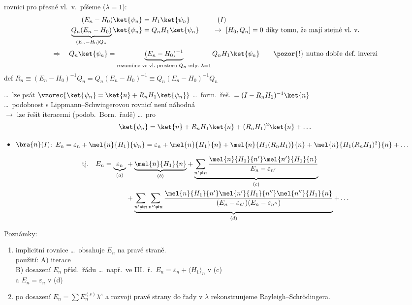 rovnici pro přesné vl.\ v.\ píšeme ($\lambda = 1$):
\begin{align*}
  (E_n - H_0)\ket{\psi_n} &= H_1\ket{\psi_n} \qquad\qquad (I) \\
  \underbrace{Q_n(E_n - H_0)}_{(E_n - H_0)Q_n}\ket{\psi_n} &= Q_nH_1\ket{\psi_n}
  \qquad\to\ [H_0,Q_n] = 0 \text{ díky tomu, že mají stejné vl.\ v.}
\end{align*}
\[
  \Rightarrow\quad Q_n\ket{\psi_n} = \underbrace{(E_n - H_0)^{-1}}_{\text{rozumíme ve vl.\ prostoru } Q_n \text{ odp.\ } \lambda = 1}Q_nH_1\ket{\psi_n}
  \qquad \text{\pozor{!} nutno dobře def.\ inverzi}
\]
def \quad $R_n \equiv (E_n - H_0)^{-1}Q_n = Q_n(E_n - H_0)^{-1} \equiv Q_n(E_n - H_0)^{-1}Q_n$

\dots\ lze psát \quad $\vzorec{\ket{\psi_n} = \ket{n} + R_nH_1\ket{\psi_n}}$ \quad \dots\ form.\ řeš.\ $= (I - R_nH_1)^{-1}\ket{n}$
 \\
\dots\ podobnost s Lippmann--Schwingerovou rovnicí není náhodná \\
$\to$ lze řešit iteracemi (podob.\ Born.\ řadě) \dots\ pro 
\[
  \ket{\psi_n} = \ket{n} + R_nH_1\ket{n} + (R_nH_1)^2\ket{n} + \dots
\]
\begin{itemize}
  \item $\bra{n}(I)$: \quad $E_n = \varepsilon_n + \mel{n}{H_1}{\psi_n} = \varepsilon_n + \mel{n}{H_1}{n} + \mel{n}{H_1(R_nH_1)}{n} + \mel{n}{H_1(R_nH_1)^2}{n} + \dots$
\end{itemize}
\begin{veta}
\begin{align*}
  \text{tj.}\quad
  E_n = \underbrace{\varepsilon_n}_{(a)} &+ \underbrace{\mel{n}{H_1}{n}}_{(b)}
  + \underbrace{\sum_{n'\neq n}\frac{\mel{n}{H_1}{n'}\mel{n'}{H_1}{n}}{E_n - \varepsilon_{n'}}}_{(c)} \\
  &+ \underbrace{\sum_{n'\neq n}\sum_{n''\neq n}\frac{\mel{n}{H_1}{n'}\mel{n'}{H_1}{n''}\mel{n''}{H_1}{n}}{(E_n - \varepsilon_{n'})(E_n - \varepsilon_{n''})}}_{(d)} + \dots
\end{align*}
\end{veta}

\underline{Poznámky:}
\begin{enumerate}[label=\arabic*)]
  \item implicitní rovnice \dots\ obsahuje $E_n$ na pravé straně. \\
        použití: \quad A) iterace \\
        \phantom{použití:} \quad B) dosazení $E_n$ přísl.\ řádu \dots\ např.\ ve III.\ ř.\ $E_n = \varepsilon_n + \langle H_1\rangle_n$ v (c) \\
        \hspace*{8.6cm} a $E_n = \varepsilon_n$ v (d)
  \item po dosazení $E_n = \sum E_n^{(s)}\lambda^s$ a rozvoji pravé strany do řady v $\lambda$ rekonstruujeme Rayleigh--Schrödingera.
\end{enumerate}

